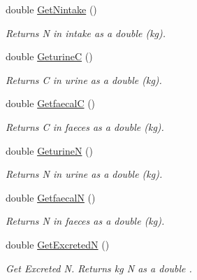 \begin{DoxyCompactItemize}
double \mbox{\hyperlink{classlivestock_ae354b6d283542c620c13c26d56885ceb}{Get\+Nintake}} ()
\begin{DoxyCompactList}\small\item\em Returns N in intake as a double (kg). \end{DoxyCompactList}\item 
\mbox{\label{classlivestock_a9f65c516bc1d05f80486bf8086fa6d57}} 
double \mbox{\hyperlink{classlivestock_a9f65c516bc1d05f80486bf8086fa6d57}{GeturineC}} ()
\begin{DoxyCompactList}\small\item\em Returns C in urine as a double (kg). \end{DoxyCompactList}\item 
\mbox{\label{classlivestock_a91b8a5b2c1b40f6f010a8a3b8f67c5ed}} 
double \mbox{\hyperlink{classlivestock_a91b8a5b2c1b40f6f010a8a3b8f67c5ed}{GetfaecalC}} ()
\begin{DoxyCompactList}\small\item\em Returns C in faeces as a double (kg). \end{DoxyCompactList}\item 
\mbox{\label{classlivestock_a093a6fa94cb68cbc9c2c5f9ba9310a1c}} 
double \mbox{\hyperlink{classlivestock_a093a6fa94cb68cbc9c2c5f9ba9310a1c}{GeturineN}} ()
\begin{DoxyCompactList}\small\item\em Returns N in urine as a double (kg). \end{DoxyCompactList}\item 
\mbox{\label{classlivestock_a181b286d51da38385a3528d3b27a9734}} 
double \mbox{\hyperlink{classlivestock_a181b286d51da38385a3528d3b27a9734}{GetfaecalN}} ()
\begin{DoxyCompactList}\small\item\em Returns N in faeces as a double (kg). \end{DoxyCompactList}\item 
\mbox{\label{classlivestock_a311826e97a54c6df177b975b78d878f0}} 
double \mbox{\hyperlink{classlivestock_a311826e97a54c6df177b975b78d878f0}{Get\+ExcretedN}} ()
\begin{DoxyCompactList}\small\item\em Get Excreted N. Returns kg N as a double . \end{DoxyCompactList}\item 

\end{DoxyCompactItemize}
